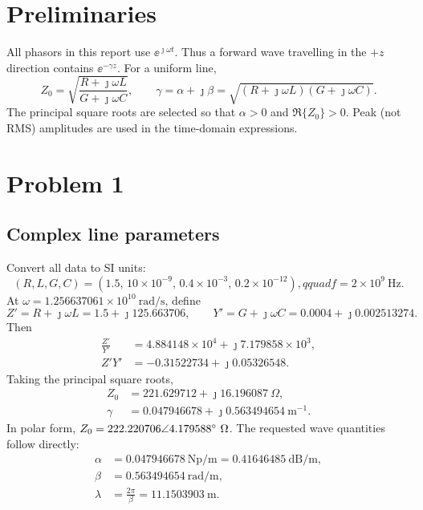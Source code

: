 \documentclass[12pt,a4paper]{article}
\begin{document}
\MakeTitlePage
\tableofcontents
\newpage

\section{Preliminaries}

All phasors in this report use $\ee^{\jmath\omega t}$.  Thus a forward wave
travelling in the $+z$ direction contains $\ee^{-\gamma z}$.  For a uniform
line,
\begin{equation}
Z_0=\sqrt{\frac{R+\jmath\omega L}{G+\jmath\omega C}},
\qquad
\gamma=\alpha+\jmath\beta
=\sqrt{(R+\jmath\omega L)(G+\jmath\omega C)}.
\end{equation}
The principal square roots are selected so that $\alpha>0$ and
$\Re\{Z_0\}>0$.  Peak (not RMS) amplitudes are used in the time-domain
expressions.

\section{Problem 1}

\subsection{Complex line parameters}

\LineElementDiagram

Convert all data to SI units:
\[
(R,L,G,C)=(1.5,\,10\times10^{-9},\,0.4\times10^{-3},\,
0.2\times10^{-12}),qquad f=2\times10^9~\mathrm{Hz}.
\]
At $\omega=1.256637061\times10^{10}~\mathrm{rad/s}$, define
\[
Z'=R+\jmath\omega L=1.5+\jmath125.663706,
\qquad
Y'=G+\jmath\omega C=0.0004+\jmath0.002513274.
\]
Then
\begin{align*}
\frac{Z'}{Y'}&=4.884148\times10^4+\jmath7.179858\times10^3,\\
Z'Y'&=-0.31522734+\jmath0.05326548.
\end{align*}
Taking the principal square roots,
\begin{align}
Z_0&=221.629712+\jmath16.196087~\Omega,\\
\gamma&=0.047946678+\jmath0.563494654~\mathrm{m}^{-1}.
\end{align}
In polar form, $Z_0=222.220706\angle4.179588^{\circ}~\Omega$.  The requested
wave quantities follow directly:
\begin{align}
\alpha&=0.047946678~\mathrm{Np/m}
=0.41646485~\mathrm{dB/m},\\
\beta&=0.563494654~\mathrm{rad/m},\\
\lambda&=\frac{2\pi}{\beta}=11.1503903~\mathrm{m}.
\end{align}
\end{document}
